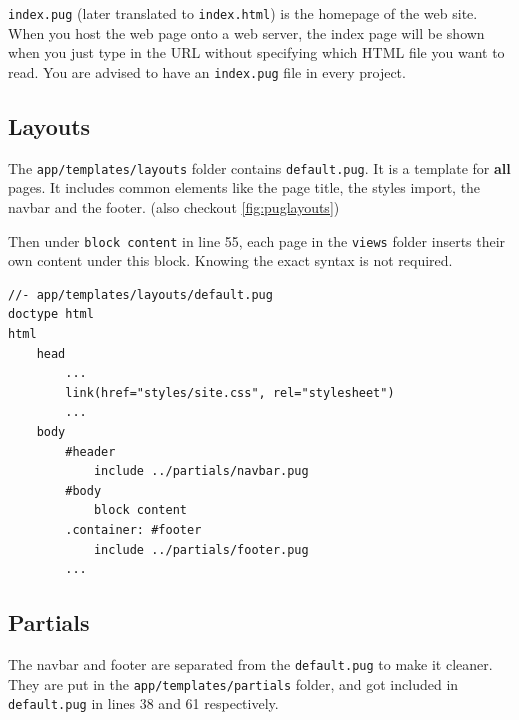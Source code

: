 \texttt{index.pug} (later translated to \texttt{index.html}) is the homepage of the web site. When you host the web page onto a web server, the index page will be shown when you just type in the URL without specifying which HTML file you want to read. You are advised to have an \texttt{index.pug} file in every project.

\subsection*{Layouts}

The \texttt{app/templates/layouts} folder contains \texttt{default.pug}. It is a template for \textbf{all} pages. It includes common elements like the page title, the styles import, the navbar and the footer. (also checkout \cref{fig:puglayouts})

Then under \texttt{block content} in line 55, each page in the \texttt{views} folder inserts their own content under this block. Knowing the exact syntax is not required.

\begin{lstlisting}[language=pug]
//- app/templates/layouts/default.pug
doctype html
html
	head
		...
		link(href="styles/site.css", rel="stylesheet")
		...
	body
		#header
			include ../partials/navbar.pug
		#body
			block content
		.container: #footer
			include ../partials/footer.pug
        ...
\end{lstlisting}

\subsection*{Partials}

The navbar and footer are separated from the \texttt{default.pug} to make it cleaner. They are put in the \texttt{app/templates/partials} folder, and got included in \texttt{default.pug} in lines 38 and 61 respectively.

